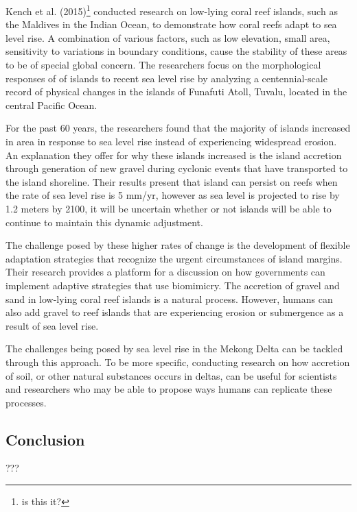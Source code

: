 Kench et al. (2015)\footnote{\citet{kench2015coral} is this it?} conducted research on low-lying coral reef islands, such as the Maldives in the Indian Ocean, to demonstrate how coral reefs adapt to sea level rise. A combination of various factors, such as low elevation, small area, sensitivity to variations in boundary conditions, cause the stability of these areas to be of special global concern. The researchers focus on the morphological responses of of islands to recent sea level rise by analyzing a centennial-scale record of physical changes in the islands of Funafuti Atoll, Tuvalu, located in the central Pacific Ocean. 

For the past 60 years, the researchers found that the majority of islands increased in area in response to sea level rise instead of experiencing widespread erosion. An explanation they offer for why these islands increased is the island accretion through generation of new gravel during cyclonic events that have transported to the island shoreline. Their results present that island can persist on reefs when the rate of sea level rise is 5 mm/yr, however as sea level is projected to rise by 1.2 meters by 2100, it will be uncertain whether or not islands will be able to continue to maintain this dynamic adjustment. 

The challenge posed by these higher rates of change is the development of flexible adaptation strategies that recognize the urgent circumstances of island margins. Their research provides a platform for a discussion on how governments can implement adaptive strategies that use biomimicry. The accretion of gravel and sand in low-lying coral reef islands is a natural process. However, humans can also add gravel to reef islands that are experiencing erosion or submergence as a result of sea level rise. 

The challenges being posed by sea level rise in the Mekong Delta can be tackled through this approach. To be more specific, conducting research on how accretion of soil, or other natural substances occurs in deltas, can be useful for scientists and researchers who may be able to propose ways humans can  replicate these processes. 

\subsection{Conclusion}

???

